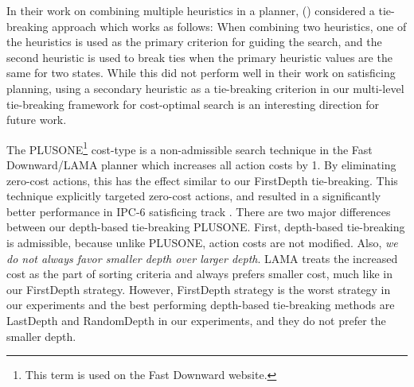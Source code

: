 In their work on combining multiple heuristics in a planner, \citeauthor{RogerH10}
(\citeyear{RogerH10}) considered a tie-breaking approach which works as follows:
When combining two heuristics, one of the
heuristics is used as the primary criterion for guiding the search,
and the second heuristic is used to break ties when the primary
heuristic values are the same for two states.
While this did not perform well in their work on satisficing planning, 
using a secondary heuristic as a tie-breaking criterion in our multi-level tie-breaking framework 
for cost-optimal search is an interesting direction for future work.

The PLUSONE\footnote{This term is used on the Fast Downward website.}
cost-type is a non-admissible search technique in the Fast Downward/LAMA planner
\cite{richter2010lama} which increases all action costs by 1.
By eliminating zero-cost actions, this has the effect similar to our
FirstDepth tie-breaking.
This technique explicitly targeted zero-cost actions,
and resulted in a significantly better performance in IPC-6
satisficing track \cite[p.137, Sec. 3.3.2]{richter2010lama}.
There are two  major differences between  our depth-based tie-breaking PLUSONE.
First, depth-based tie-breaking is admissible,
because unlike PLUSONE, action costs are not modified.  Also, \emph{we
do not always favor smaller depth over larger depth}. LAMA treats the
increased cost as the part of sorting criteria and always prefers
smaller cost, much like in our FirstDepth strategy.  However, FirstDepth
strategy is the worst strategy in our experiments and the best
performing depth-based tie-breaking methods are LastDepth and RandomDepth
in our experiments, and they do not prefer the smaller depth.

